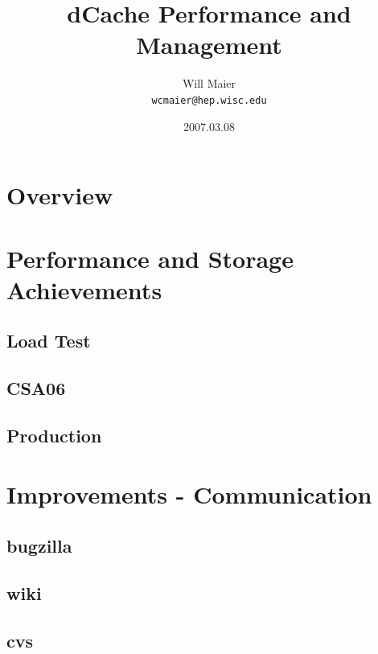 \documentclass{beamer}
\title{dCache Performance and Management}
\author[Will Maier]{Will Maier \\ \texttt{wcmaier@hep.wisc.edu}}
\institute[Wisconsin]{University of Wisconsin}
\date{2007.03.08}
\begin{document}
\begin{frame}
    \titlepage
\end{frame}

\section{Overview}
\begin{frame}
    \tableofcontents
\end{frame}

\section{Performance and Storage Achievements}
\subsection{Load Test}
\begin{frame}
\end{frame}

\subsection{CSA06}
\begin{frame}
\end{frame}

\subsection{Production}
\begin{frame}
\end{frame}

\section{Improvements - Communication}
\subsection{bugzilla}
\begin{frame}
\end{frame}

\subsection{wiki}
\begin{frame}
\end{frame}

\subsection{cvs}
\begin{frame}
\end{frame}
\end{document}
